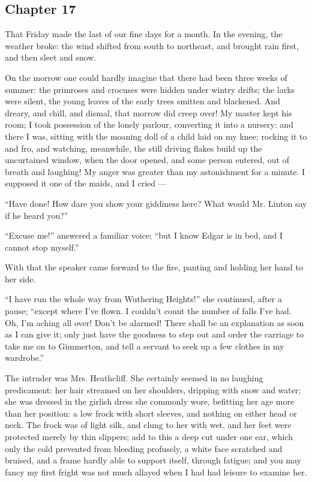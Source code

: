 \subsection*{Chapter 17}

\par That Friday made the last of our fine days for a month. In the evening, the weather broke: the wind shifted from south to northeast, and brought rain first, and then sleet and snow.
\par On the morrow one could hardly imagine that there had been three weeks of summer: the primroses and crocuses were hidden under wintry drifts; the larks were silent, the young leaves of the early trees smitten and blackened. And dreary, and chill, and dismal, that morrow did creep over! My master kept his room; I took possession of the lonely parlour, converting it into a nursery: and there I was, sitting with the moaning doll of a child laid on my knee; rocking it to and fro, and watching, meanwhile, the still driving flakes build up the uncurtained window, when the door opened, and some person entered, out of breath and laughing! My anger was greater than my astonishment for a minute. I supposed it one of the maids, and I cried —
\par “Have done! How dare you show your giddiness here? What would Mr. Linton say if he heard you?”
\par “Excuse me!” answered a familiar voice; “but I know Edgar is in bed, and I cannot stop myself.”
\par With that the speaker came forward to the fire, panting and holding her hand to her side.
\par “I have run the whole way from Wuthering Heights!” she continued, after a pause; “except where I've flown. I couldn't count the number of falls I've had. Oh, I'm aching all over! Don't be alarmed! There shall be an explanation as soon as I can give it; only just have the goodness to step out and order the carriage to take me on to Gimmerton, and tell a servant to seek up a few clothes in my wardrobe.”
\par The intruder was Mrs. Heathcliff. She certainly seemed in no laughing predicament: her hair streamed on her shoulders, dripping with snow and water; she was dressed in the girlish dress she commonly wore, befitting her age more than her position: a low frock with short sleeves, and nothing on either head or neck. The frock was of light silk, and clung to her with wet, and her feet were protected merely by thin slippers; add to this a deep cut under one ear, which only the cold prevented from bleeding profusely, a white face scratched and bruised, and a frame hardly able to support itself, through fatigue; and you may fancy my first fright was not much allayed when I had had leisure to examine her.
